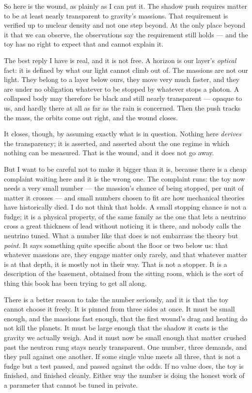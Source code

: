 So here is the wound, as plainly as I can put it. The shadow push requires matter to be at least nearly transparent to gravity's massions. That requirement is verified up to nuclear density and not one step beyond. At the only place beyond it that we can observe, the observations say the requirement still holds --- and the toy has no right to expect that and cannot explain it.

The best reply I have is real, and it is not free. A horizon is our layer's \emph{optical} fact: it is defined by what our light cannot climb out of. The massions are not our light. They belong to a layer below ours, they move very much faster, and they are under no obligation whatever to be stopped by whatever stops a photon. A collapsed body may therefore be black and still nearly transparent --- opaque to us, and hardly there at all as far as the rain is concerned. Then the push tracks the mass, the orbits come out right, and the wound closes.

It closes, though, by assuming exactly what is in question. Nothing here \emph{derives} the transparency; it is asserted, and asserted about the one regime in which nothing can be measured. That is the wound, and it does not go away.

But I want to be careful not to make it bigger than it is, because there is a cheap complaint waiting here and it is the wrong one. The complaint runs: the toy now needs a very small number --- the massion's chance of being stopped, per unit of matter it crosses --- and small numbers chosen to fit are how mechanical theories have historically died. I do not think that holds. A small stopping chance is not a fudge; it is a physical property, of the same family as the one that lets a neutrino cross a great thickness of lead without noticing it is there, and nobody calls the neutrino tuned. What a number like that does is not embarrass the theory but \emph{point}. It says something quite specific about the floor or two below us: that whatever massions are, they engage matter only rarely, and that whatever matter is at that depth, it is mostly not in their way. That is not a stopper. It is a description of the basement, obtained from the sitting room, which is the sort of thing this book has been trying to get all along.

There is a better reason to take the number seriously, and it is that the toy cannot choose it freely. It is pinned from three sides at once. It must be small enough, and the massions fast enough, that the first wound's drag and heating do not kill the planets. It must be large enough that the shadow it casts is the gravity we actually weigh. And it must now be small enough that matter crushed past the neutron rung stays nearly transparent. One number, three demands, and they pull against one another. If some single value meets all three, that is not a fudge but a test passed, and passed against the odds. If no value does, the toy is finished, and finished cleanly. Either way the number is doing the honest work of a parameter that cannot be tuned in private.

